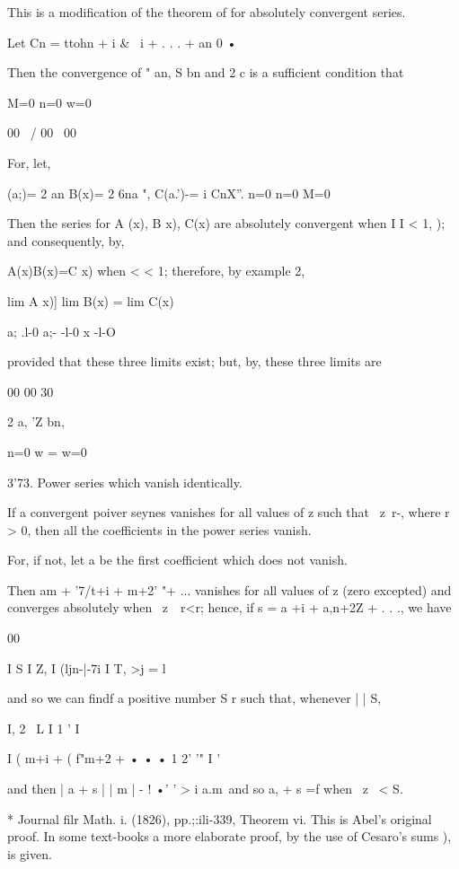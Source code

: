 This is a modification of the theorem of for absolutely
convergent series.

Let Cn = ttohn + i \& \ i + . . . + an 0 •

Then the convergence of " an, S bn and 2 c is a sufficient condition
that

M=0 n=0 w=0

 00 \ / 00 \ 00

For, let,

 (a;)= 2 an B(x)= 2 6na ", C(a.')-= i CnX''. n=0 n=0 M=0

Then the series for A (x), B x), C(x) are absolutely convergent when I
I < 1, ); and consequently, by,

A(x)B(x)=C x) when < < 1; therefore, by example 2,

  lim A x)] lim B(x) = lim C(x)\

a; .l-0 a;- -l-0 x -l-O

provided that these three limits exist; but, by, these three
limits are

00 00 30

2 a, 'Z bn, %

n=0 w = w=0

3'73. Power series which vanish identically.

If a convergent poiver seynes vanishes for all values of z such that \
z\ r-, where r > 0, then all the coefficients in the power series
vanish.

For, if not, let a be the first coefficient which does not vanish.

Then am + '7/t+i + m+2' "+ ... vanishes for all values of z (zero
excepted) and converges absolutely when \ z\ \ r<r; hence, if s = a
+i + a,n+2Z + . . ., we have

00

I S I Z, I (ljn-|-7i I T, >j = l

and so we can findf a positive number S r such that, whenever | | S,

I, 2 \ L I 1 ' I

I ( m+i + ( f"m+2 + • • • 1 2' '" I '

and then | a + s | | m | - ! •' ' > i a.m\, and so a, + s =f when \ z
\ < S.

* Journal filr Math. i. (1826), pp.;:ili-339, Theorem vi. This is
Abel's original proof. In some text-books a more elaborate proof, by
the use of Cesaro's sums \hardsubsectionref{8}{4}{3}), is given.

